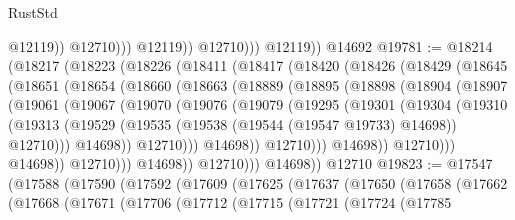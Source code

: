 \begin{lexlean}{RustStd}
\begin{coremodule}
                            @12119))
                        @12710)))
                  @12119))
              @12710)))
        @12119))
    @14692
@19781 := @18214
    (@18217
      (@18223
        (@18226
          (@18411
            (@18417
              (@18420
                (@18426
                  (@18429
                    (@18645
                      (@18651
                        (@18654
                          (@18660
                            (@18663
                              (@18889
                                (@18895
                                  (@18898
                                    (@18904
                                      (@18907
                                        (@19061
                                          (@19067
                                            (@19070
                                              (@19076
                                                (@19079
                                                  (@19295
                                                    (@19301
                                                      (@19304
                                                        (@19310
                                                          (@19313
                                                            (@19529
                                                              (@19535
                                                                (@19538
                                                                  (@19544 (@19547 @19733) @14698))
                                                                @12710)))
                                                          @14698))
                                                      @12710)))
                                                @14698))
                                            @12710)))
                                      @14698))
                                  @12710)))
                            @14698))
                        @12710)))
                  @14698))
              @12710)))
        @14698))
    @12710
@19823 := @17547
    (@17588
      (@17590
        (@17592
          (@17609
            (@17625
              (@17637
                (@17650
                  (@17658
                    (@17662
                      (@17668
                        (@17671
                          (@17706
                            (@17712
                              (@17715
                                (@17721
                                  (@17724
                                    (@17785

\end{coremodule}
\end{lexlean}
